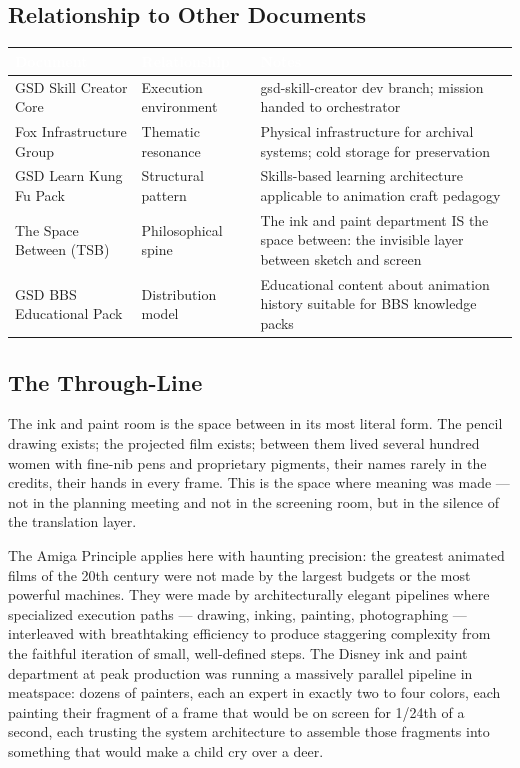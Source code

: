 \documentclass[11pt,letterpaper]{article}
\newcommand{\tableheader}[1]{\textbf{\sffamily\textcolor{white}{#1}}}
\begin{document}
\subsection{Relationship to Other Documents}

\begin{center}
\begin{tabularx}{\textwidth}{L{4cm}L{4cm}X}
\toprule
{}
\tableheader{Document} & \tableheader{Relationship} & \tableheader{Notes} \\
\midrule
GSD Skill Creator Core & Execution environment & gsd-skill-creator dev branch; mission handed to orchestrator \\
Fox Infrastructure Group & Thematic resonance & Physical infrastructure for archival systems; cold storage for preservation \\
GSD Learn Kung Fu Pack & Structural pattern & Skills-based learning architecture applicable to animation craft pedagogy \\
The Space Between (TSB) & Philosophical spine & The ink and paint department IS the space between: the invisible layer between sketch and screen \\
GSD BBS Educational Pack & Distribution model & Educational content about animation history suitable for BBS knowledge packs \\
\bottomrule
\end{tabularx}
\end{center}

\subsection{The Through-Line}

The ink and paint room is the space between in its most literal form. The pencil drawing exists; the projected film exists; between them lived several hundred women with fine-nib pens and proprietary pigments, their names rarely in the credits, their hands in every frame. This is the space where meaning was made --- not in the planning meeting and not in the screening room, but in the silence of the translation layer.

The Amiga Principle applies here with haunting precision: the greatest animated films of the 20th century were not made by the largest budgets or the most powerful machines. They were made by architecturally elegant pipelines where specialized execution paths --- drawing, inking, painting, photographing --- interleaved with breathtaking efficiency to produce staggering complexity from the faithful iteration of small, well-defined steps. The Disney ink and paint department at peak production was running a massively parallel pipeline in meatspace: dozens of painters, each an expert in exactly two to four colors, each painting their fragment of a frame that would be on screen for 1/24th of a second, each trusting the system architecture to assemble those fragments into something that would make a child cry over a deer.
\end{document}
